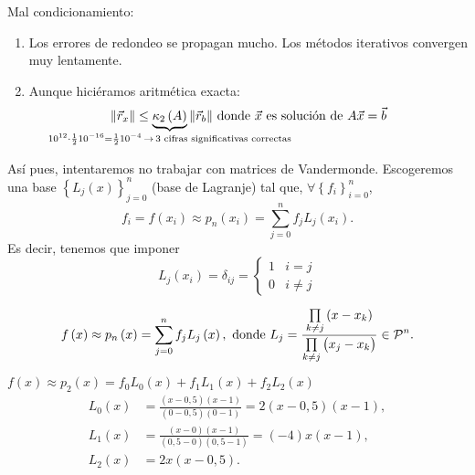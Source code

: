 \noindent Mal condicionamiento:
\begin{enumerate}[1)]
    \item Los errores de redondeo se propagan mucho. Los métodos iterativos convergen muy lentamente.
    \item Aunque hiciéramos aritmética exacta:
        \[
            \|\vec{r}_x\| \leq \underbrace{\kappa_2 \left( A \right)}_{\mathclap{10^{12}\cdot \frac{1}{2}10^{-16} = \frac{1}{2}10^{-4} \,\rightarrow\, 3\text{ cifras significativas correctas}}} \|\vec{r}_b\|\text{ donde }\vec{x}\text{ es solución de }A\vec{x} = \vec{b}
        \]
\end{enumerate}

\noindent Así pues, intentaremos no trabajar con matrices de Vandermonde. Escogeremos una base $\left\{ L_j\left( x \right) \right\}^n_{j=0}$ (base de Lagranje) tal que, $\forall \left\{ f_i \right\}^n_{i=0}$,
\[
    f_i = f\left( x_i \right) \approx p_n\left( x_i \right) = \sum^n_{j=0} f_jL_j\left( x_i \right).
\]
Es decir, tenemos que imponer
\[
    L_j\left( x_i \right) = \delta_{ij} =
    \begin{cases}
        1 & i=j \\
        0 & i\neq j
    \end{cases}
\]

\begin{defi}
    \[
        f\left( x \right) \approx p_n\left( x \right) = \sum_{j=0}^{n} f_jL_j\left( x \right), \text{ donde } L_j = \frac{\prod\limits_{k\neq j}\left( x-x_k \right)}{\prod\limits_{k\neq j}\left( x_j - x_k \right)} \in \mathcal{P}^n.
    \]
\end{defi}

\begin{example} %
    $f\left( x \right)\approx p_2\left( x \right) = f_0L_0\left( x \right) + f_1L_1\left( x \right) + f_2L_2\left( x \right)$
    \begin{align*}
        L_0\left( x \right) &= \frac{\left( x-0,5 \right)\left( x-1 \right)}{\left( 0-0,5 \right)\left( 0-1 \right)} = 2\left( x-0,5 \right)\left( x-1 \right),\\
        L_1\left( x \right) &= \frac{\left( x-0 \right)\left( x-1 \right)}{\left( 0,5-0 \right)\left( 0,5-1 \right)} = \left( -4 \right)x\left( x-1 \right),\\
        L_2\left( x \right) &= 2x\left( x-0,5 \right).
    \end{align*}
\end{example}

